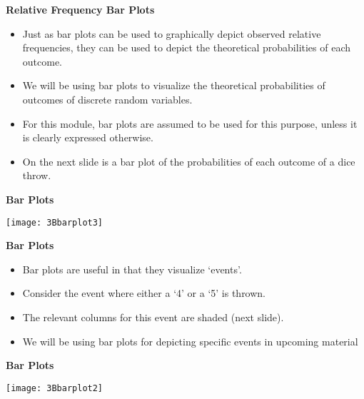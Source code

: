 \documentclass[]{report}
\begin{document}
	
	{
		\textbf{Relative Frequency Bar Plots}
		
		\begin{itemize}
			\item  Just as bar plots can be used to graphically depict observed relative frequencies, they can be used to
			depict the theoretical probabilities of each outcome.
			\item  We will be using bar plots to visualize the theoretical probabilities of outcomes of discrete random variables.
			\item  For this module, bar plots are assumed to be used for this purpose, unless it is clearly expressed otherwise.
			\item  On the next slide is a bar plot of the probabilities of each outcome of a dice throw.
		\end{itemize}
		
	}
	
	
	
	{
		\textbf{Bar Plots}
		\begin{center}
			\texttt{[image: 3Bbarplot3]}
		\end{center}
	}
	
	{
		\textbf{Bar Plots}
		
		\begin{itemize}
			\item  Bar plots are useful in that they visualize `events'.
			\item  Consider the event where either a `4' or a `5' is thrown.
			\item  The relevant columns for this event are shaded (next slide).
			\item  We will be using bar plots for depicting specific events in upcoming material
		\end{itemize}
		
	}
	
	{
		\textbf{Bar Plots}
		
		\begin{center}
			\texttt{[image: 3Bbarplot2]}
		\end{center}
	}
\end{document}
